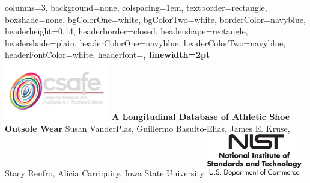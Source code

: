 \documentclass[landscape, a0paper, fontscale=0.275, margin = 30mm]{baposter} %
\begin{document}
\begin{poster}
{
columns=3,
background=none,
colspacing=1em, %
textborder=rectangle, %
boxshade=none,
bgColorOne=white,
bgColorTwo=white,
borderColor=navyblue,
headerheight=0.14\textheight, %
headerborder=closed, %
headershape=rectangle, %
headershade=plain,
headerColorOne=navyblue,
headerColorTwo=navyblue,
headerFontColor=white,
headerfont=\Large\bf, %
linewidth=2pt %
}
%
{\includegraphics[height=7em]{logo.png}} %
{\huge\bf A Longitudinal Database of Athletic Shoe Outsole Wear\vspace{0.3em}} %
{{\Large Susan VanderPlas, Guillermo Basulto-Elias, James E. Kruse, \\Stacy Renfro, Alicia Carriquiry, Iowa State University}\vspace*{-0.6em}} %
{\includegraphics[height=5em]{logo-NIST.jpg}} %




\end{poster}
\end{document}
